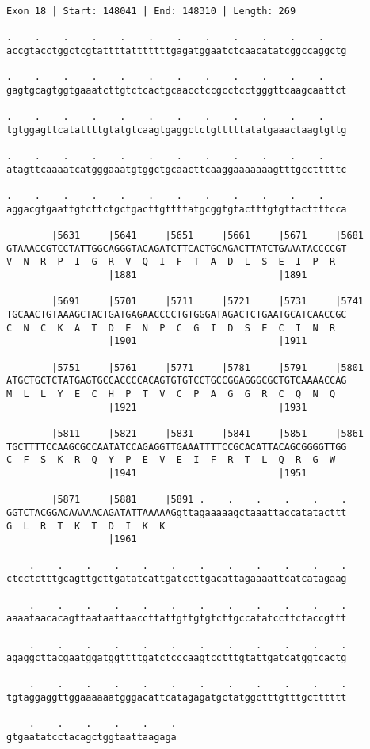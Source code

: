 \documentclass{article}
\begin{document}
\begin{Verbatim}
Exon 18 | Start: 148041 | End: 148310 | Length: 269
 
.    .    .    .    .    .    .    .    .    .    .    .    
accgtacctggctcgtattttatttttttgagatggaatctcaacatatcggccaggctg
  
.    .    .    .    .    .    .    .    .    .    .    .    
gagtgcagtggtgaaatcttgtctcactgcaacctccgcctcctgggttcaagcaattct
  
.    .    .    .    .    .    .    .    .    .    .    .    
tgtggagttcatattttgtatgtcaagtgaggctctgtttttatatgaaactaagtgttg
  
.    .    .    .    .    .    .    .    .    .    .    .    
atagttcaaaatcatgggaaatgtggctgcaacttcaaggaaaaaaagtttgcctttttc
  
.    .    .    .    .    .    .    .    .    .    .    .    
aggacgtgaattgtcttctgctgacttgttttatgcggtgtactttgtgttacttttcca
  
        |5631     |5641     |5651     |5661     |5671     |5681
GTAAACCGTCCTATTGGCAGGGTACAGATCTTCACTGCAGACTTATCTGAAATACCCCGT
V  N  R  P  I  G  R  V  Q  I  F  T  A  D  L  S  E  I  P  R  
                  |1881                         |1891       
  
        |5691     |5701     |5711     |5721     |5731     |5741
TGCAACTGTAAAGCTACTGATGAGAACCCCTGTGGGATAGACTCTGAATGCATCAACCGC
C  N  C  K  A  T  D  E  N  P  C  G  I  D  S  E  C  I  N  R  
                  |1901                         |1911       
  
        |5751     |5761     |5771     |5781     |5791     |5801
ATGCTGCTCTATGAGTGCCACCCCACAGTGTGTCCTGCCGGAGGGCGCTGTCAAAACCAG
M  L  L  Y  E  C  H  P  T  V  C  P  A  G  G  R  C  Q  N  Q  
                  |1921                         |1931       
  
        |5811     |5821     |5831     |5841     |5851     |5861
TGCTTTTCCAAGCGCCAATATCCAGAGGTTGAAATTTTCCGCACATTACAGCGGGGTTGG
C  F  S  K  R  Q  Y  P  E  V  E  I  F  R  T  L  Q  R  G  W  
                  |1941                         |1951       
  
        |5871     |5881     |5891 .    .    .    .    .    .
GGTCTACGGACAAAAACAGATATTAAAAAGgttagaaaaagctaaattaccatatacttt
G  L  R  T  K  T  D  I  K  K                                
                  |1961                                     
  
    .    .    .    .    .    .    .    .    .    .    .    .
ctcctctttgcagttgcttgatatcattgatccttgacattagaaaattcatcatagaag
  
    .    .    .    .    .    .    .    .    .    .    .    .
aaaataacacagttaataattaaccttattgttgtgtcttgccatatccttctaccgttt
  
    .    .    .    .    .    .    .    .    .    .    .    .
agaggcttacgaatggatggttttgatctcccaagtcctttgtattgatcatggtcactg
  
    .    .    .    .    .    .    .    .    .    .    .    .
tgtaggaggttggaaaaaatgggacattcatagagatgctatggctttgtttgctttttt
  
    .    .    .    .    .    .
gtgaatatcctacagctggtaattaagaga
\end{Verbatim}
\end{document}
